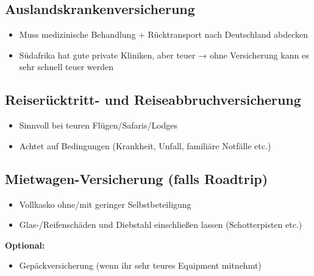 \documentclass[12pt,a4paper]{article}
\begin{document}
\begin{infobox}[title={\faShieldAlt \hspace{0.2cm} Unbedingt prüfen/abschließen}]

\subsection*{\color{mainblue}\faHospital\;\; Auslandskrankenversicherung}

\begin{itemize}[leftmargin=*,label={\color{mainblue}\faChevronRight}]
    \item Muss medizinische Behandlung + Rücktransport nach Deutschland abdecken
    \item Südafrika hat gute private Kliniken, aber teuer → ohne Versicherung kann es sehr schnell teuer werden\cite{accept-reisen-1}
\end{itemize}

\subsection*{\color{accentorange}\faUmbrella\;\; Reiserücktritt- und Reiseabbruchversicherung}

\begin{itemize}[leftmargin=*,label={\color{accentorange}\faChevronRight}]
    \item Sinnvoll bei teuren Flügen/Safaris/Lodges
    \item Achtet auf Bedingungen (Krankheit, Unfall, familiäre Notfälle etc.)
\end{itemize}

\subsection*{\color{darkgreen}\faCar\;\; Mietwagen-Versicherung (falls Roadtrip)}

\begin{itemize}[leftmargin=*,label={\color{darkgreen}\faChevronRight}]
    \item Vollkasko ohne/mit geringer Selbstbeteiligung
    \item Glas-/Reifenschäden und Diebstahl einschließen lassen (Schotterpisten etc.)
\end{itemize}

\end{infobox}

\vspace{0.3cm}

\textbf{Optional:}
\begin{itemize}[leftmargin=*,label={\color{deeppurple}\faSuitcase}]
    \item Gepäckversicherung (wenn ihr sehr teures Equipment mitnehmt)
\end{itemize}
\end{document}
